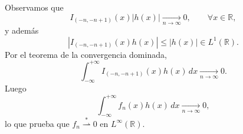 \documentclass[12pt]{article}
\begin{document}
\begin{ejercicio}[4 puntos ]
\begin{enumerate}
\begin{description}
            Observamos que
            \[
            I_{(-n,-n+1)}(x)|h(x)| \xrightarrow[n \to \infty]{}0,
            \qquad \forall x\in\mathbb{R},
            \]
            y además
            \[
            |I_{(-n,-n+1)}(x)h(x)| \le |h(x)| \in L^1(\mathbb{R}).
            \]
            Por el teorema de la convergencia dominada,
            \[
            \int_{-\infty}^{+\infty}
            I_{(-n,-n+1)}(x)h(x)\,dx
            \xrightarrow[n \to \infty]{}0.
            \]
            Luego
            \[
            \int_{-\infty}^{+\infty} f_n(x)h(x)\,dx
            \xrightarrow[n \to \infty]{}0,
            \]
            lo que prueba que $f_n \stackrel{\ast}{\rightharpoonup} 0$ en $L^\infty(\mathbb{R})$.
        \end{description}
    \end{enumerate}
\end{ejercicio}
\end{document}
